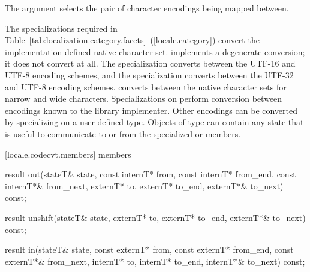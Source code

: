 \pnum
The
argument selects the pair of character encodings being mapped between.

\pnum
The specializations required in Table~\ref{tab:localization.category.facets}~(\ref{locale.category})
convert the implementation-defined native character set.
implements a degenerate conversion;
it does not convert at all.
The specialization  
converts between the UTF-16 and UTF-8 encoding schemes, and
the specialization  
converts between the UTF-32 and UTF-8 encoding schemes.
converts between the native character sets for narrow and wide characters.
Specializations on
perform conversion between encodings known to the library implementer.
Other encodings can be converted by specializing on a user-defined
type.
Objects of type
can contain any state that is useful to communicate to or from
the specialized
or
members.

[locale.codecvt.members]{ members}

%
%
\begin{itemdecl}
result out(stateT& state,
  const internT* from, const internT* from_end, const internT*& from_next,
        externT* to, externT* to_end, externT*& to_next) const;
\end{itemdecl}

\begin{itemdescr}
\pnum
\returns
{}
\end{itemdescr}

%
%
\begin{itemdecl}
result unshift(stateT& state,
        externT* to, externT* to_end, externT*& to_next) const;
\end{itemdecl}

\begin{itemdescr}
\pnum
\returns
{}
\end{itemdescr}

%
%
\begin{itemdecl}
result in(stateT& state,
  const externT* from, const externT* from_end, const externT*& from_next,
        internT* to, internT* to_end, internT*& to_next) const;
\end{itemdecl}

